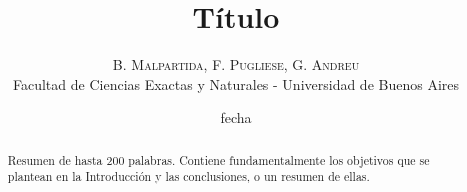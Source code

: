 \documentclass[twoside]{article}
\title{\vspace{-15mm}\fontsize{24pt}{10pt}\selectfont\textbf{T\'itulo}} %
\author{
\large
\textsc{B. Malpartida, F. Pugliese, G. Andreu}\\[2mm] %
\normalsize Facultad de Ciencias Exactas y Naturales - Universidad de Buenos Aires \\ %
\vspace{-5mm}
}
\date{fecha}
\begin{document}
\maketitle %

\thispagestyle{fancy} %


\begin{abstract}

Resumen de hasta 200 palabras. Contiene fundamentalmente los objetivos que se plantean en la Introducción y las conclusiones, o un resumen de ellas.  %

\end{abstract}

\end{document}

